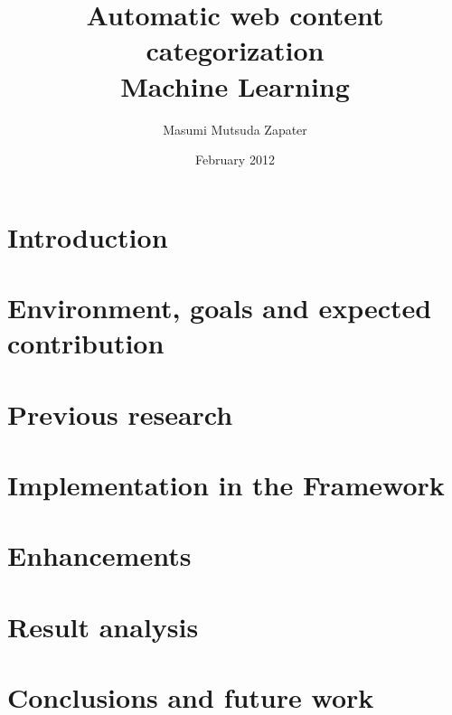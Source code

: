 \documentclass[12pt, a4paper , titlepage]{report}
\author{Masumi Mutsuda Zapater}
\title{Automatic web content categorization \\ Machine Learning}
\date{February 2012}
\begin{document}
\maketitle



\tableofcontents


\chapter{Introduction}


\chapter{Environment, goals and expected contribution}


\chapter{Previous research}


\chapter{Implementation in the Framework}


\chapter{Enhancements}


\chapter{Result analysis}


\chapter{Conclusions and future work}



\end{document}
